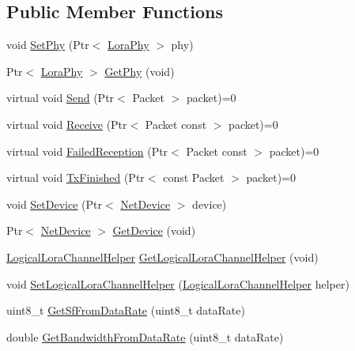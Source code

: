 \subsection*{Public Member Functions}
\begin{DoxyCompactItemize}
\item 
void \hyperlink{classns3_1_1lorawan_1_1LoraMac_a924a856293cc8a21f7c476acb18f8b5f}{Set\+Phy} (Ptr$<$ \hyperlink{classns3_1_1lorawan_1_1LoraPhy}{Lora\+Phy} $>$ phy)
\item 
Ptr$<$ \hyperlink{classns3_1_1lorawan_1_1LoraPhy}{Lora\+Phy} $>$ \hyperlink{classns3_1_1lorawan_1_1LoraMac_a991b6aa211889b6321e64f772c64cbfc}{Get\+Phy} (void)
\item 
virtual void \hyperlink{classns3_1_1lorawan_1_1LoraMac_ac2f3fd92536658192bfa3d1523fff716}{Send} (Ptr$<$ Packet $>$ packet)=0
\item 
virtual void \hyperlink{classns3_1_1lorawan_1_1LoraMac_a6eda46656789a277b8e103afcefdc21a}{Receive} (Ptr$<$ Packet const $>$ packet)=0
\item 
virtual void \hyperlink{classns3_1_1lorawan_1_1LoraMac_afcd55472bbfa299c4d0239d5fa9957e3}{Failed\+Reception} (Ptr$<$ Packet const $>$ packet)=0
\item 
virtual void \hyperlink{classns3_1_1lorawan_1_1LoraMac_aa64037192af83dc459487bccccd10bdf}{Tx\+Finished} (Ptr$<$ const Packet $>$ packet)=0
\item 
void \hyperlink{classns3_1_1lorawan_1_1LoraMac_a3b5d08b43f747474078bb78c45af01aa}{Set\+Device} (Ptr$<$ \hyperlink{classNetDevice}{Net\+Device} $>$ device)
\item 
Ptr$<$ \hyperlink{classNetDevice}{Net\+Device} $>$ \hyperlink{classns3_1_1lorawan_1_1LoraMac_a1037ae338de4f96866666697ddfc5809}{Get\+Device} (void)
\item 
\hyperlink{classns3_1_1lorawan_1_1LogicalLoraChannelHelper}{Logical\+Lora\+Channel\+Helper} \hyperlink{classns3_1_1lorawan_1_1LoraMac_a1f2ade596a55c0baa9a0252f5b7d04a7}{Get\+Logical\+Lora\+Channel\+Helper} (void)
\item 
void \hyperlink{classns3_1_1lorawan_1_1LoraMac_a831dc8e920c489e90bc643ee807ac434}{Set\+Logical\+Lora\+Channel\+Helper} (\hyperlink{classns3_1_1lorawan_1_1LogicalLoraChannelHelper}{Logical\+Lora\+Channel\+Helper} helper)
\item 
uint8\+\_\+t \hyperlink{classns3_1_1lorawan_1_1LoraMac_ae35eb49a530a0e339340959bcd2413e8}{Get\+Sf\+From\+Data\+Rate} (uint8\+\_\+t data\+Rate)
\item 
double \hyperlink{classns3_1_1lorawan_1_1LoraMac_a0b17634f15b5808b0fa992464f0197d0}{Get\+Bandwidth\+From\+Data\+Rate} (uint8\+\_\+t data\+Rate)

\end{DoxyCompactItemize}
